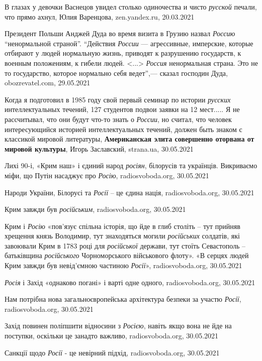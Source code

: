В глазах у девочки Васнецов увидел столько одиночества и чисто \emph{русской}
печали, что прямо ахнул, Юлия Варенцова, zen.yandex.ru, 20.03.2021

Президент Польши Анджей Дуда во время визита в Грузию назвал \emph{Россию}
\enquote{ненормальной страной}.  \enquote{Действия \emph{России} — агрессивные,
имперские, которые отбирают у людей нормальную жизнь, приводят к разрушению
государств, к военным положениям, к гибели людей. <...> \emph{Россия} ненормальная
страна. Это не то государство, которое нормально себя ведет},— сказал господин
Дуда, obozrevatel.com, 29.05.2021

Когда я подготовил в 1985 году свой первый семинар по истории \emph{русских}
интеллектуальных течений, 127 студентов подвои заявки на 12 мест.....  Я не
рассчитывал, что они будут что-то знать о \emph{России}, но считал, что человек
интересующийся историей интеллектуальных течений, должен быть знаком с
классикой мировой литературы, \textbf{Американская элита совершенно оторвана от
мировой культуры}, Игорь Заславский, strana.ua, 30.05.2021

Лихі 90-і, «Крим наш» і єдиний народ \emph{росіян}, білорусів та українців.
Викриваємо міфи, що Путін насаджує про \emph{Росію}, radiosvoboda.org,
30.05.2021

Народи України, Білорусі та \emph{Росії} – це єдина нація, radiosvoboda.org,
30.05.2021

Крим завжди був \emph{російським}, radiosvoboda.org, 30.05.2021

Крим і \emph{Росію} «пов'язує спільна історія, що йде в глиб століть – тут
прийняв хрещення князь Володимир, тут знаходяться могили \emph{російських}
солдатів, які завоювали Крим в 1783 році для \emph{російської} держави, тут
стоїть Севастополь – батьківщина \emph{російського} Чорноморського військового
флоту». «В серцях людей Крим завжди був невід'ємною частиною \emph{Росії}»,
radiosvoboda.org, 30.05.2021

\emph{Росія} і Захід «однаково погані» і варті одне одного, radiosvoboda.org, 30.05.2021

Нам потрібна нова загальноєвропейська архітектура безпеки за участю
\emph{Росії}, radiosvoboda.org, 30.05.2021

Захід повинен поліпшити відносини з \emph{Росією}, навіть якщо вона не йде на
поступки, оскільки це занадто важливо, radiosvoboda.org, 30.05.2021

Санкції щодо \emph{Росії} - це невірний підхід, radiosvoboda.org, 30.05.2021

